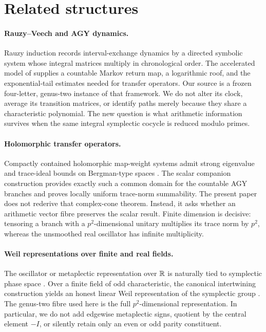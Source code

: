 \section{Related structures}

\paragraph{Rauzy--Veech and AGY dynamics.}
Rauzy induction records interval-exchange dynamics by a directed symbolic
system whose integral matrices multiply in chronological order.  The
accelerated model of \citet{agy2006} supplies a countable Markov return map,
a logarithmic roof, and the exponential-tail estimates needed for transfer
operators.  Our source is a frozen four-letter, genus-two instance of that
framework.  We do not alter its clock, average its transition matrices, or
identify paths merely because they share a characteristic polynomial.  The
new question is what arithmetic information survives when the same integral
symplectic cocycle is reduced modulo primes.

\paragraph{Holomorphic transfer operators.}
Compactly contained holomorphic map-weight systems admit strong eigenvalue
and trace-ideal bounds on Bergman-type spaces
\citep{bandtlow2008explicit,bandtlow2008ruelle}.  The scalar companion
construction provides exactly such a common domain for the countable AGY
branches and proves locally uniform trace-norm summability.  The present
paper does not rederive that complex-cone theorem.  Instead, it asks whether
an arithmetic vector fibre preserves the scalar result.  Finite dimension is
decisive: tensoring a branch with a \(p^2\)-dimensional unitary multiplies its
trace norm by \(p^2\), whereas the unsmoothed real oscillator has infinite
multiplicity.

\paragraph{Weil representations over finite and real fields.}
The oscillator or metaplectic representation over \(\mathbb{R}\) is naturally tied
to symplectic phase space \citep{folland1989}.  Over a finite field of odd
characteristic, the canonical intertwining construction yields an honest
linear Weil representation of the symplectic group
\citep{gurevich2009}.  The genus-two fibre used here is the full
\(p^2\)-dimensional representation.  In particular, we do not add edgewise
metaplectic signs, quotient by the central element \(-I\), or silently retain
only an even or odd parity constituent.

